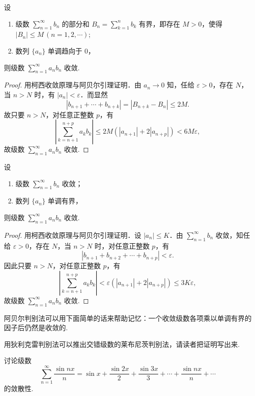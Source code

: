 \begin{theorem}[狄利克雷判别法]\label{thm:10-17}
设
\begin{enumerate}[label=(\roman*)]
\item 级数 $\displaystyle\sum_{n=1}^{\infty}b_{n}$ 的部分和 $B_{n}=\sum_{k=1}^{n}b_{k}$ 有界，即存在 $M>0$，使得 $|B_{n}|\leq M\,(n=1,2,\cdots)$;
\item 数列 $\{a_{n}\}$ 单调趋向于 $0$，
\end{enumerate}
则级数 $\displaystyle\sum_{n=1}^{\infty}a_{n}b_{n}$ 收敛.
\end{theorem}

\begin{proof}
用柯西收敛原理与阿贝尔引理证明．由 $a_{n}\to0$ 知，任给 $\varepsilon>0$，存在 $N$，当 $n>N$ 时，有 $|a_{n}|<\varepsilon$．而显然
\[
|b_{n+1}+\cdots+b_{n+k}|=|B_{n+k}-B_{n}|\leqslant2M.
\]
故只要 $n>N$，对任意正整数 $p$，有
\[
\left|\sum_{k=n+1}^{n+p}a_{k}b_{k}\right|\leqslant2M\left(|a_{n+1}|+2|a_{n+p}|\right)<6M\varepsilon,
\]
故级数 $\displaystyle\sum_{n=1}^{\infty}a_{n}b_{n}$ 收敛.
\end{proof}

\begin{theorem}[阿贝尔判别法]\label{thm:10-18}
设
\begin{enumerate}[label=(\roman*)]
\item 级数 $\displaystyle\sum_{n=1}^{\infty}b_{n}$ 收敛；
\item 数列 $\{a_{n}\}$ 单调有界，
\end{enumerate}
则级数 $\displaystyle\sum_{n=1}^{\infty}a_{n}b_{n}$ 收敛.
\end{theorem}

\begin{proof}
用柯西收敛原理与阿贝尔引理证明．设 $|a_{n}|\leqslant K$．由 $\sum_{n=1}^{\infty}b_{n}$ 收敛，知任给 $\varepsilon>0$，存在 $N$，当 $n>N$ 时，对任意正整数 $p$，有
\[
|b_{n+1}+b_{n+2}+\cdots+b_{n+p}|<\varepsilon.
\]
因此只要 $n>N$，对任意正整数 $p$，有
\[
\left|\sum_{k=n+1}^{n+p}a_{k}b_{k}\right|<\varepsilon\left(|a_{n+1}|+2|a_{n+p}|\right)\leqslant3K\varepsilon,
\]
故级数 $\displaystyle\sum_{n=1}^{\infty}a_{n}b_{n}$ 收敛.
\end{proof}

阿贝尔判别法可以用下面简单的话来帮助记忆：一个收敛级数各项乘以单调有界的因子后仍然是收敛的.

用狄利克雷判别法可以推出交错级数的莱布尼茨判别法，请读者把证明写出来.

\begin{example}\label{ex:10-4-3-1}
讨论级数
\[
\sum_{n=1}^{\infty}\frac{\sin nx}{n}=\sin x+\frac{\sin 2x}{2}+\frac{\sin 3x}{3}+\cdots+\frac{\sin nx}{n}+\cdots
\]
的敛散性.
\end{example}

